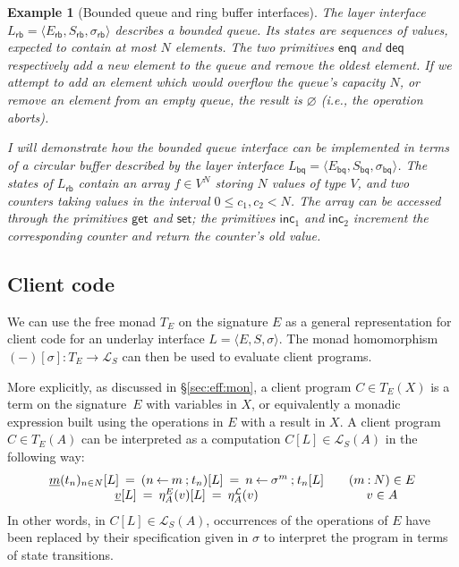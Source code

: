 \documentclass[11pt,oneside]{book}
\newtheorem{example}[theorem]{Example}
\theoremstyle{definition}
\newcommand{\kw}[1]{\ensuremath{ \mathsf{#1} }}
\newcommand{\ul}[1]{%
  \underline{\smash{#1}}
}
\begin{document}
\begin{example}[Bounded queue and ring buffer interfaces] %
The layer interface
$L_\kw{rb} = \langle E_\kw{rb}, S_\kw{rb}, \sigma_\kw{rb} \rangle$
describes a bounded queue.
Its states are sequences of values,
expected to contain at most $N$ elements.
The two primitives
$\kw{enq}$ and $\kw{deq}$
respectively add a new element to the queue
and remove the oldest element.
If we attempt to add an element
which would overflow the queue's capacity $N$,
or remove an element from an empty queue,
the result is $\varnothing$ (i.e., the operation aborts).

I will demonstrate how the bounded queue interface
can be implemented in terms of a circular buffer
described by the layer interface
$L_\kw{bq} = \langle E_\kw{bq}, S_\kw{bq}, \sigma_\kw{bq} \rangle$.
The states of $L_\kw{rb}$
contain an array $f \in V^N$
storing $N$ values of type $V$,
and two counters
taking values in the interval $0 \le c_1, c_2 < N$.
The array can be accessed through the primitives
$\kw{get}$ and $\kw{set}$;
the primitives $\kw{inc}_1$ and $\kw{inc}_2$
increment the corresponding counter
and return the counter's old value.
\end{example}


\subsection{Client code} \label{sec:cal:cli} %

We can use the free monad $T_E$ on the signature $E$
as a general representation for client code for
an underlay interface $L = \langle E, S, \sigma \rangle$.
The monad homomorphism $(-)[\sigma] : T_E \rightarrow \mathcal{L}_S$
can then be used to evaluate client programs.

More explicitly,
as discussed in \S\ref{sec:eff:mon},
a client program $C \in T_E(X)$
is a term on the signature~$E$ with variables in $X$,
or equivalently a monadic expression built using
the operations in $E$ with a result in $X$.
A client program $C \in T_E(A)$
can be interpreted as
a computation $C[L] \in \mathcal{L}_S(A)$ in the following way:
\[
  \begin{array}{c@{\qquad}c}
    \ul{m}(t_n)_{n \in N}[L] \: = \:
      (n \mathbin\leftarrow m \mathbin; t_n)[L] \: = \:
      n \mathbin\leftarrow \sigma^m \mathbin; t_n[L] &
      (m \mathbin: N) \in E \\
    \ul{v}[L] \: = \:
      \eta^E_A(v)[L] \: = \:
      \eta^\mathcal{L}_A(v) &
      v \in A
  \end{array}
\]
In other words, in $C[L] \in \mathcal{L}_S(A)$,
occurrences of the operations of $E$
have been replaced by their specification given in $\sigma$
to interpret the program in terms of state transitions.
\end{document}
